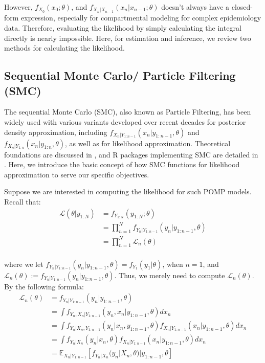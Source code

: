 \documentclass[10pt]{article}
\begin{document}
However, $f_{X_0}(x_0;\theta)$, and $f_{X_n|X_{n-1}}(x_n|x_{n-1};\theta)$ doesn't always have a closed-form expression, especially for compartmental modeling for complex epidemiology data. Therefore, evaluating the likelihood by simply calculating the integral directly is nearly impossible. Here, for estimation and inference, we review two methods for calculating the likelihood.


\subsection{Sequential Monte Carlo/ Particle Filtering (SMC)}

The sequential Monte Carlo (SMC), also known as Particle Filtering, has been widely used with various variants developed over recent decades for posterior density approximation, including $f_{X_n|Y_{1:n-1}}(x_n|y_{1:n-1}, \theta)$ and $f_{X_n|Y_{1:n}}(x_n|y_{1:n},\theta)$, as well as for likelihood approximation. Theoretical foundations are discussed in \cite{Chopin, Doucet, liujun}, and R packages implementing SMC are detailed in \cite{pomppackagepaper}. Here, we introduce the basic concept of how SMC functions for likelihood approximation to serve our specific objectives.

Suppose we are interested in computing the likelihood for such POMP models. Recall that:
\begin{align*} 
\mathcal{L}(\theta|y_{1:N}) &= f_{Y_{1:N}}(y_{1:N}; \theta) \\
&=  \prod_{n=1}^N f_{Y_n|Y_{1:n-1}}(y_n|y_{1:n-1}, \theta) \\
&=  \prod_{n=1}^N \mathcal{L}_n(\theta) \\
\end{align*}
\vspace{-20mm}

where we let $f_{Y_n|Y_{1:n-1}}(y_n|y_{1:n-1}, \theta) = f_{Y_1}(y_1| \theta)$, when $n=1$, and $\mathcal{L}_n(\theta) := f_{Y_n|Y_{1:n-1}}(y_n|y_{1:n-1}, \theta)$.
Thus, we merely need to compute $\mathcal{L}_n(\theta)$. By the following formula:
\begin{align*}
    \mathcal{L}_n(\theta) &= f_{Y_n|Y_{1:n-1}}(y_n|y_{1:n-1}, \theta) \\
    &=  \int f_{Y_n,X_n|Y_{1:n-1}}(y_n, x_n|y_{1:n-1}, \theta)dx_n \\
    &=  \int f_{Y_n|X_{n},Y_{1:n-1}}(y_n| x_n,y_{1:n-1}, \theta)f_{X_n|Y_{1:n-1}}(x_n|y_{1:n-1}, \theta)dx_n \\
    & = \int f_{Y_n|X_{n}}(y_n|x_n, \theta)f_{X_n|Y_{1:n-1}}(x_n|y_{1:n-1}, \theta)dx_n \\
    &= \mathds{E}_{X_n|Y_{1:n-1}}[f_{Y_n|X_{n}}(y_n|X_n,\theta)|y_{1:n-1},\theta]
\end{align*}
\end{document}
